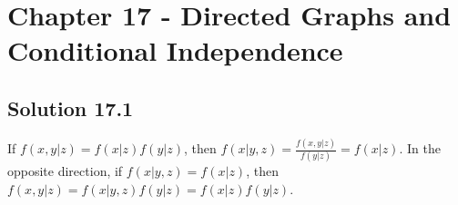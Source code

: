 \section*{Chapter 17 - Directed Graphs and Conditional Independence}

\subsection*{Solution 17.1}

If $f(x,y|z) = f(x|z)f(y|z)$, then $f(x|y,z) = \frac{f(x,y|z)}{f(y|z)} = f(x|z)$.
In the opposite direction, if $f(x|y,z) = f(x|z)$, then $f(x,y|z) = f(x|y,z)f(y|z) = f(x|z)f(y|z)$.
